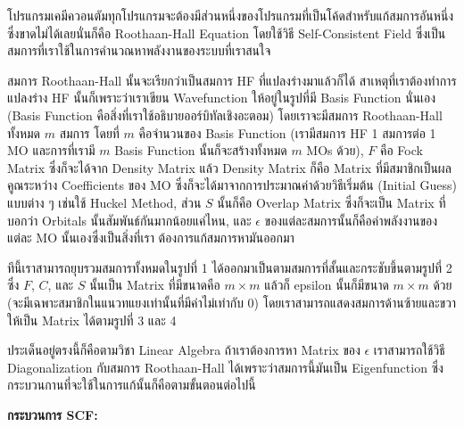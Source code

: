 โปรแกรมเคมีควอนตัมทุกโปรแกรมจะต้องมีส่วนหนึ่งของโปรแกรมที่เป็นโค้ดสำหรับแก้สมการอันหนึ่งซึ่งขาดไม่ได้เลยนั่นก็คือ Roothaan-Hall
Equation โดยใช้วิธี Self-Consistent Field ซึ่งเป็นสมการที่เราใช้ในการคำนวณหาพลังงานของระบบที่เราสนใจ

สมการ Roothaan-Hall นั้นจะเรียกว่าเป็นสมการ HF ที่แปลงร่างมาแล้วก็ได้ สาเหตุที่เราต้องทำการแปลงร่าง HF นั้นก็เพราะว่าเราเขียน
Wavefunction ให้อยู่ในรูปที่มี Basis Function นั่นเอง (Basis Function คือสิ่งที่เราใช้อธิบายออร์บิทัลเชิงอะตอม) โดยเราจะมีสมการ
Roothaan-Hall ทั้งหมด $m$ สมการ โดยที่ $m$ คือจำนวนของ Basis Function (เรามีสมการ HF 1 สมการต่อ 1 MO และการที่เรามี
$m$ Basis Function นั้นก็จะสร้างทั้งหมด $m$ MOs ด้วย), $F$ คือ Fock Matrix ซึ่งก็จะได้จาก Density Matrix แล้ว
Density Matrix ก็คือ Matrix ที่มีสมาชิกเป็นผลคูณระหว่าง Coefficients ของ MO ซึ่งก็จะได้มาจากการประมาณค่าด้วยวิธีเริ่มต้น
(Initial Guess) แบบต่าง ๆ เช่นใช้ Huckel Method, ส่วน $S$ นั้นก็คือ Overlap Matrix ซึ่งก็จะเป็น Matrix ที่บอกว่า
Orbitals นั้นสัมพันธ์กันมากน้อยแค่ไหน, และ $\epsilon$ ของแต่ละสมการนั้นก็คือค่าพลังงานของแต่ละ MO นั้นเองซึ่งเป็นสิ่งที่เรา%
ต้องการแก้สมการหามันออกมา

ทีนี้เราสามารถยุบรวมสมการทั้งหมดในรูปที่ 1 ได้ออกมาเป็นตามสมการที่สั้นและกระชับขึ้นตามรูปที่ 2 ซึ่ง $F$, $C$, และ $S$ นั้นเป็น Matrix
ที่มีขนาดคือ $m \times m$ แล้วก็ epsilon นั้นก็มีขนาด $m \times m$ ด้วย (จะมีเฉพาะสมาชิกในแนวทแยงเท่านั้นที่มีค่าไม่เท่ากับ 0)
โดยเราสามารถแสดงสมการด้านซ้ายและขวาให้เป็น Matrix ได้ตามรูปที่ 3 และ 4

ประเด็นอยู่ตรงนี้ก็คือตามวิชา Linear Algebra ถ้าเราต้องการหา Matrix ของ $\epsilon$ เราสามารถใช้วิธี Diagonalization
กับสมการ Roothaan-Hall ได้เพราะว่าสมการนี้มันเป็น Eigenfunction ซึ่งกระบวนกานที่จะใช้ในการแก้นั้นก็คือตามขั้นตอนต่อไปนี้

\noindent \textbf{กระบวนการ SCF:}

